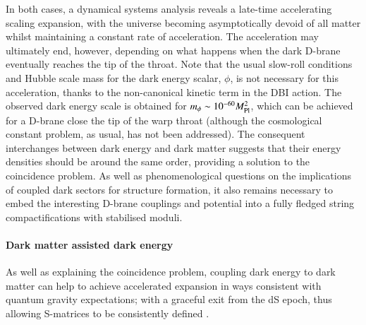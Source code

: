  In both cases, a dynamical systems analysis reveals a late-time accelerating scaling expansion, with the universe becoming asymptotically devoid of all matter whilst maintaining a constant rate of acceleration. The acceleration may ultimately end, however, depending on what happens when the dark D-brane eventually reaches the tip of the throat. Note that the usual slow-roll conditions and Hubble scale mass for the dark energy scalar, $\phi$, is not necessary for this acceleration, thanks to the non-canonical kinetic term in the DBI action. The observed dark energy scale is obtained for $m_\phi \sim 10^{-60} M_{\rm Pl}^2$, which can be achieved for a D-brane close the tip of the warp throat (although the cosmological constant problem, as usual, has not been addressed). The consequent interchanges between dark energy and dark matter suggests that their energy densities should be around the same order, providing a solution to the coincidence problem. As well as phenomenological questions on the implications of coupled dark sectors for structure formation, it also remains necessary to embed the interesting D-brane couplings and potential into a fully fledged string compactifications with stabilised moduli.

\paragraph{Dark matter assisted dark energy}

As well as explaining the coincidence problem, coupling dark energy to dark matter can help to achieve accelerated expansion in ways consistent with quantum gravity expectations; with a graceful exit from the dS epoch, thus allowing S-matrices to be consistently defined \cite{Gomez:2022}. 

